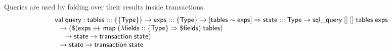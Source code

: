 \documentclass{article}
\newcommand{\mt}[1]{\mathsf{#1}}
\newcommand{\rc}{+ \hspace{-.075in} + \;}
\begin{document}
Queries are used by folding over their results inside transactions.
$$\begin{array}{l}
  \mt{val} \; \mt{query} : \mt{tables} ::: \{\{\mt{Type}\}\} \to \mt{exps} ::: \{\mt{Type}\} \to [\mt{tables} \sim \mt{exps}] \Rightarrow \mt{state} ::: \mt{Type} \to \mt{sql\_query} \; [] \; [] \; \mt{tables} \; \mt{exps} \\
  \hspace{.1in} \to (\$(\mt{exps} \rc \mt{map} \; (\lambda \mt{fields} :: \{\mt{Type}\} \Rightarrow \$\mt{fields}) \; \mt{tables}) \\
  \hspace{.2in} \to \mt{state} \to \mt{transaction} \; \mt{state}) \\
  \hspace{.1in} \to \mt{state} \to \mt{transaction} \; \mt{state}
\end{array}$$
\end{document}
